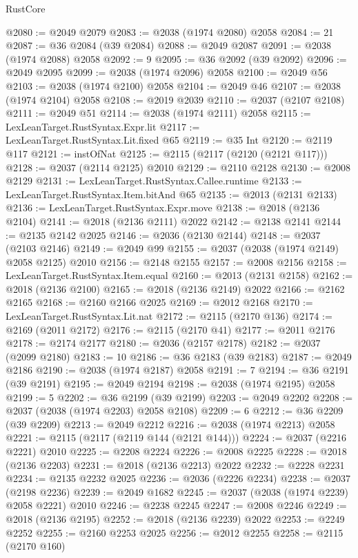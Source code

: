 \begin{lexlean}{RustCore}
\begin{coremodule}
@2080 := @2049 @2079
@2083 := @2038 (@1974 @2080) @2058
@2084 := 21
@2087 := @36 @2084 (@39 @2084)
@2088 := @2049 @2087
@2091 := @2038 (@1974 @2088) @2058
@2092 := 9
@2095 := @36 @2092 (@39 @2092)
@2096 := @2049 @2095
@2099 := @2038 (@1974 @2096) @2058
@2100 := @2049 @56
@2103 := @2038 (@1974 @2100) @2058
@2104 := @2049 @46
@2107 := @2038 (@1974 @2104) @2058
@2108 := @2019 @2039
@2110 := @2037 (@2107 @2108)
@2111 := @2049 @51
@2114 := @2038 (@1974 @2111) @2058
@2115 := LexLeanTarget.RustSyntax.Expr.lit
@2117 := LexLeanTarget.RustSyntax.Lit.fixed @65
@2119 := @35 Int
@2120 := @2119 @117
@2121 := instOfNat
@2125 := @2115 (@2117 (@2120 (@2121 @117)))
@2128 := @2037 (@2114 @2125) @2010
@2129 := @2110 @2128
@2130 := @2008 @2129
@2131 := LexLeanTarget.RustSyntax.Callee.runtime
@2133 := LexLeanTarget.RustSyntax.Item.bitAnd @65
@2135 := @2013 (@2131 @2133)
@2136 := LexLeanTarget.RustSyntax.Expr.move
@2138 := @2018 (@2136 @2104)
@2141 := @2018 (@2136 @2111) @2022
@2142 := @2138 @2141
@2144 := @2135 @2142 @2025
@2146 := @2036 (@2130 @2144)
@2148 := @2037 (@2103 @2146)
@2149 := @2049 @99
@2155 := @2037 (@2038 (@1974 @2149) @2058 @2125) @2010
@2156 := @2148 @2155
@2157 := @2008 @2156
@2158 := LexLeanTarget.RustSyntax.Item.equal
@2160 := @2013 (@2131 @2158)
@2162 := @2018 (@2136 @2100)
@2165 := @2018 (@2136 @2149) @2022
@2166 := @2162 @2165
@2168 := @2160 @2166 @2025
@2169 := @2012 @2168
@2170 := LexLeanTarget.RustSyntax.Lit.nat
@2172 := @2115 (@2170 @136)
@2174 := @2169 (@2011 @2172)
@2176 := @2115 (@2170 @41)
@2177 := @2011 @2176
@2178 := @2174 @2177
@2180 := @2036 (@2157 @2178)
@2182 := @2037 (@2099 @2180)
@2183 := 10
@2186 := @36 @2183 (@39 @2183)
@2187 := @2049 @2186
@2190 := @2038 (@1974 @2187) @2058
@2191 := 7
@2194 := @36 @2191 (@39 @2191)
@2195 := @2049 @2194
@2198 := @2038 (@1974 @2195) @2058
@2199 := 5
@2202 := @36 @2199 (@39 @2199)
@2203 := @2049 @2202
@2208 := @2037 (@2038 (@1974 @2203) @2058 @2108)
@2209 := 6
@2212 := @36 @2209 (@39 @2209)
@2213 := @2049 @2212
@2216 := @2038 (@1974 @2213) @2058
@2221 := @2115 (@2117 (@2119 @144 (@2121 @144)))
@2224 := @2037 (@2216 @2221) @2010
@2225 := @2208 @2224
@2226 := @2008 @2225
@2228 := @2018 (@2136 @2203)
@2231 := @2018 (@2136 @2213) @2022
@2232 := @2228 @2231
@2234 := @2135 @2232 @2025
@2236 := @2036 (@2226 @2234)
@2238 := @2037 (@2198 @2236)
@2239 := @2049 @1682
@2245 := @2037 (@2038 (@1974 @2239) @2058 @2221) @2010
@2246 := @2238 @2245
@2247 := @2008 @2246
@2249 := @2018 (@2136 @2195)
@2252 := @2018 (@2136 @2239) @2022
@2253 := @2249 @2252
@2255 := @2160 @2253 @2025
@2256 := @2012 @2255
@2258 := @2115 (@2170 @160)

\end{coremodule}
\end{lexlean}
